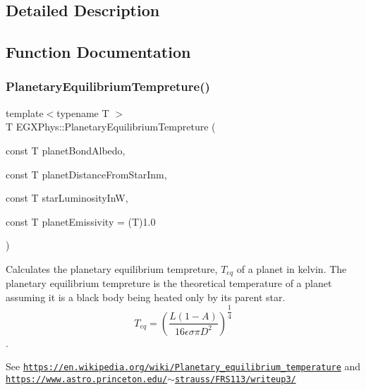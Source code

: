 \subsection{Detailed Description}


\subsection{Function Documentation}
\mbox{\label{group___e_g_x_phys-_astrophysics-_planetary_equilibrium_tempreture_ga48b1c3c35c18036586685da25085d05b}} 
\subsubsection{\texorpdfstring{Planetary\+Equilibrium\+Tempreture()}{PlanetaryEquilibriumTempreture()}\hspace{0.1cm}{\footnotesize\ttfamily [1/2]}}
{\footnotesize\ttfamily template$<$typename T $>$ \\
T E\+G\+X\+Phys\+::\+Planetary\+Equilibrium\+Tempreture (\begin{DoxyParamCaption}\item[{const T}]{planet\+Bond\+Albedo,  }\item[{const T}]{planet\+Distance\+From\+Star\+Inm,  }\item[{const T}]{star\+Luminosity\+InW,  }\item[{const T}]{planet\+Emissivity = {\ttfamily (T)1.0} }\end{DoxyParamCaption})}



Calculates the planetary equilibrium tempreture, $T_{eq}$ of a planet in kelvin. The planetary equilibrium tempreture is the theoretical temperature of a planet assuming it is a black body being heated only by its parent star. \[ T_{eq}=\left ( \dfrac{L (1-A)}{16 \epsilon \sigma \pi D^2} \right )^{\dfrac{1}{4}} \]. 

See \href{https://en.wikipedia.org/wiki/Planetary_equilibrium_temperature}{\tt https\+://en.\+wikipedia.\+org/wiki/\+Planetary\+\_\+equilibrium\+\_\+temperature} and \href{https://www.astro.princeton.edu/~strauss/FRS113/writeup3/}{\tt https\+://www.\+astro.\+princeton.\+edu/$\sim$strauss/\+F\+R\+S113/writeup3/}


